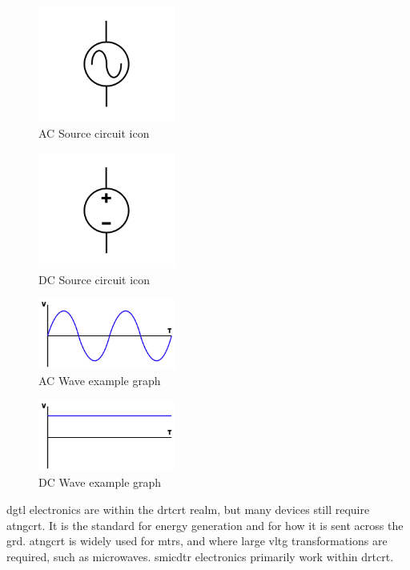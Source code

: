 \documentclass[a4paper,11pt]{report}
\begin{document}
\begin{figure}[H]
\centering
\includegraphics[width=0.4\textwidth]{acsource1}
\caption{AC Source circuit icon}
\end{figure}

\begin{figure}[H]
\centering
\includegraphics[width=0.4\textwidth]{dcsource1}
\caption{DC Source circuit icon}
\end{figure}

\begin{figure}[H]
\centering
\includegraphics[width=0.4\textwidth]{acwave}
\caption{AC Wave example graph}
\end{figure}

\begin{figure}[H]
\centering
\includegraphics[width=0.4\textwidth]{dcwave}
\caption{DC Wave example graph}
\end{figure}

\gls{dgtl} electronics are within the \gls{drtcrt} realm, but many devices still require \gls{atngcrt}. It is the standard for energy generation and for how it is sent across the \gls{grd}. \gls{atngcrt} is widely used for \gls{mtr}s, and where large \gls{vltg} transformations are required, such as microwaves. \gls{smicdtr} electronics primarily work within \gls{drtcrt}.
\end{document}
